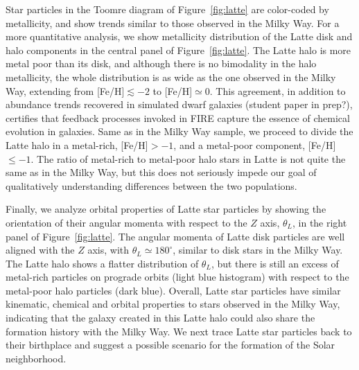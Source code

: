 \documentclass[apj, twocolappendix, numberedappendix, appendixfloats]{emulateapj}
\begin{document}
Star particles in the Toomre diagram of Figure~\ref{fig:latte} are color-coded by metallicity, and show trends similar to those observed in the Milky Way.
For a more quantitative analysis, we show metallicity distribution of the Latte disk and halo components in the central panel of Figure~\ref{fig:latte}.
The Latte halo is more metal poor than its disk, and although there is no bimodality in the halo metallicity, the whole distribution is as wide as the one observed in the Milky Way, extending from [Fe/H]$\lesssim-2$ to [Fe/H]$\simeq0$.
This agreement, in addition to abundance trends recovered in simulated dwarf galaxies (student paper in prep?), certifies that feedback processes invoked in FIRE capture the essence of chemical evolution in galaxies.
Same as in the Milky Way sample, we proceed to divide the Latte halo in a metal-rich, [Fe/H]$>-1$, and a metal-poor component, [Fe/H]$\leq-1$.
The ratio of metal-rich to metal-poor halo stars in Latte is not quite the same as in the Milky Way, but this does not seriously impede our goal of qualitatively understanding differences between the two populations.

Finally, we analyze orbital properties of Latte star particles by showing the orientation of their angular momenta with respect to the $Z$ axis, $\theta_L$, in the right panel of Figure~\ref{fig:latte}.
The angular momenta of Latte disk particles are well aligned with the $Z$ axis, with $\theta_L\simeq180^\circ$, similar to disk stars in the Milky Way.
The Latte halo shows a flatter distribution of $\theta_L$, but there is still an excess of metal-rich particles on prograde orbits (light blue histogram) with respect to the metal-poor halo particles (dark blue).
Overall, Latte star particles have similar kinematic, chemical and orbital properties to stars observed in the Milky Way, indicating that the galaxy created in this Latte halo could also share the formation history with the Milky Way.
We next trace Latte star particles back to their birthplace and suggest a possible scenario for the formation of the Solar neighborhood.
\end{document}
